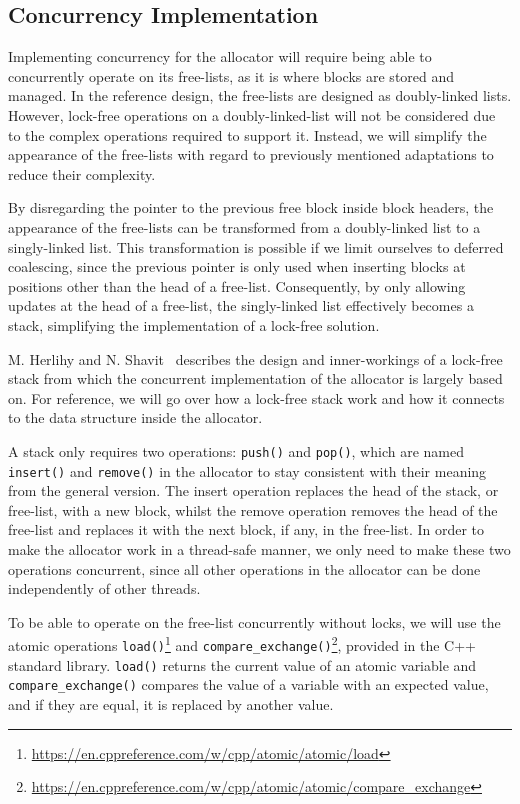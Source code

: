 \subsection{Concurrency Implementation}
\label{sec:adaptations_impl:concurrency}

Implementing concurrency for the allocator will require being able to concurrently operate on its free-lists, as it is where blocks are stored and managed. In the reference design, the free-lists are designed as doubly-linked lists. However, lock-free operations on a doubly-linked-list will not be considered due to the complex operations required to support it. Instead, we will simplify the appearance of the free-lists with regard to previously mentioned adaptations to reduce their complexity.

By disregarding the pointer to the previous free block inside block headers, the appearance of the free-lists can be transformed from a doubly-linked list to a singly-linked list. This transformation is possible if we limit ourselves to deferred coalescing, since the previous pointer is only used when inserting blocks at positions other than the head of a free-list. Consequently, by only allowing updates at the head of a free-list, the singly-linked list effectively becomes a stack, simplifying the implementation of a lock-free solution.

M. Herlihy and N. Shavit~\cite[Chapter 11]{artofmpprogramming} describes the design and inner-workings of a lock-free stack from which the concurrent implementation of the allocator is largely based on. For reference, we will go over how a lock-free stack work and how it connects to the data structure inside the allocator.

A stack only requires two operations: \texttt{push()} and \texttt{pop()}, which are named \texttt{insert()} and \texttt{remove()} in the allocator to stay consistent with their meaning from the general version. The insert operation replaces the head of the stack, or free-list, with a new block, whilst the remove operation removes the head of the free-list and replaces it with the next block, if any, in the free-list. In order to make the allocator work in a thread-safe manner, we only need to make these two operations concurrent, since all other operations in the allocator can be done independently of other threads.

To be able to operate on the free-list concurrently without locks, we will use the atomic operations \texttt{load()}\footnote{\url{https://en.cppreference.com/w/cpp/atomic/atomic/load}} and \texttt{compare\_exchange()}\footnote{\url{https://en.cppreference.com/w/cpp/atomic/atomic/compare_exchange}}, provided in the C++ standard library. \texttt{load()} returns the current value of an atomic variable and \texttt{compare\_exchange()} compares the value of a variable with an expected value, and if they are equal, it is replaced by another value.


